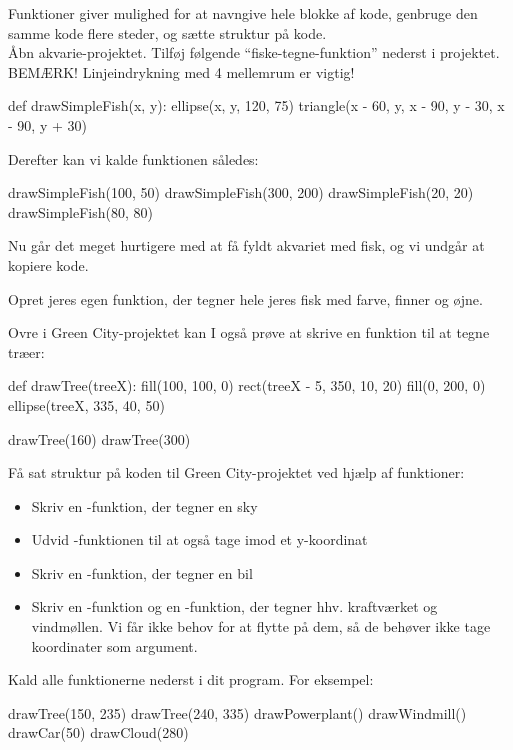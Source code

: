 \documentclass{ucph-handout}
\newcounter{handout}
\newcommand{\Ark}{Ark \#\arabic{handout} -- }
\renewcommand{\Title}{\Ark Tegn med Processing.py}%
\begin{document}
\newpage
{}
\renewcommand{\Title}{\Ark Funktioner}%

\begin{exercisebox}[adjusted title=Fiske-funktion]
Funktioner giver mulighed for at navngive hele blokke af kode,
genbruge den samme kode flere steder,
og sætte struktur på kode.\\

\noindent
Åbn akvarie-projektet. Tilføj følgende ``fiske-tegne-funktion''
nederst i projektet. BEMÆRK! Linjeindrykning med 4 mellemrum er vigtig!

\begin{python}
def drawSimpleFish(x, y):
    ellipse(x, y, 120, 75)
    triangle(x - 60, y, x - 90, y - 30, x - 90, y + 30)
\end{python}

\noindent
Derefter kan vi kalde funktionen således:
\begin{python}
drawSimpleFish(100,  50)
drawSimpleFish(300, 200)
drawSimpleFish(20, 20)
drawSimpleFish(80, 80)
\end{python}
Nu går det meget hurtigere med at få fyldt akvariet med fisk, og vi
undgår at kopiere kode.

Opret jeres egen  funktion, der tegner hele jeres
fisk med farve, finner og øjne.
\end{exercisebox}

\begin{exercisebox}[adjusted title=Green City fortsat]
Ovre i Green City-projektet kan I også prøve at skrive en funktion
til at tegne træer:
\begin{python}
def drawTree(treeX):
    fill(100, 100, 0)
    rect(treeX - 5, 350, 10, 20)
    fill(0, 200, 0)
    ellipse(treeX, 335, 40, 50)

drawTree(160)
drawTree(300)
\end{python}

\noindent
Få sat struktur på koden til Green City-projektet ved hjælp af funktioner:
\begin{itemize}
\item Skriv en -funktion, der tegner en sky
\item Udvid -funktionen til at også tage imod et y-koordinat
\item Skriv en -funktion, der tegner en bil
\item Skriv en -funktion og en
  -funktion, der tegner hhv. kraftværket og
  vindmøllen. Vi får ikke behov for at flytte på dem, så de behøver
  ikke tage koordinater som argument.
\end{itemize}

\noindent
Kald alle funktionerne nederst i dit program. For eksempel:

\begin{python}
drawTree(150, 235)
drawTree(240, 335)
drawPowerplant()
drawWindmill()
drawCar(50)
drawCloud(280)
\end{python}
\end{exercisebox}
\newpage
\end{document}
